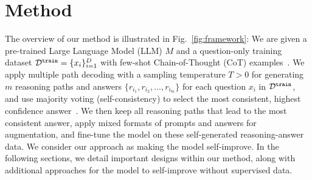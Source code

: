 \section{Method}
\label{sec:method}

The overview of our method is illustrated in Fig.~\ref{fig:framework}:
We are given a pre-trained Large Language Model (LLM) $M$ and a question-only training dataset $\mathcal{D}^{\mathtt{train}}=\{x_i\}_{i=1}^D$ with few-shot Chain-of-Thought (CoT) examples~\citep{Wei2022ChainOT}.
We apply multiple path decoding with a sampling temperature $T>0$ for generating $m$ reasoning paths and answers $\{r_{i_1}, r_{i_2}, \dots, r_{i_m}\}$ for each question $x_i$ in $\mathcal{D}^{ \mathtt{train}}$, and use majority voting (self-consistency) to select the most consistent, highest confidence answer~\citep{Wang2022SelfConsistencyIC}. We then keep all reasoning paths that lead to the most consistent answer,  apply mixed formats of prompts and answers for augmentation, and fine-tune the model on these self-generated reasoning-answer data. We consider our approach as making the model self-improve. %
In the following sections, we detail important designs within our method, along with additional approaches for the model to self-improve without supervised data.

